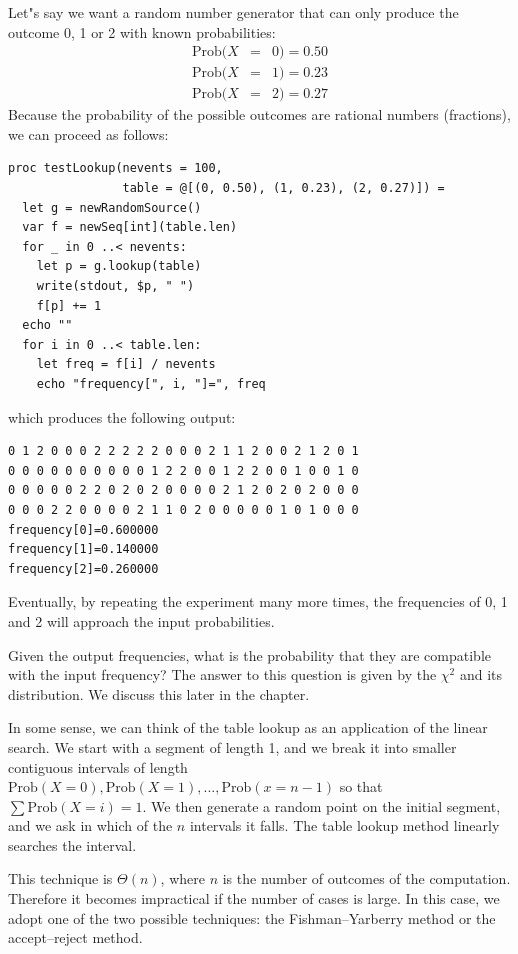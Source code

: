 \documentclass[justified, sixbynine]{tufte-book}
\theoremstyle{plain}%
\newtheorem * {corollary}{Corollary}
\theoremstyle{definition}
\theoremstyle{remark}
\newtheorem * {remark}{Remark}
\newtheorem * {note}{Note}
\begin{document}
\begin{fullwidth}
Let"s say we want a random number generator that can only produce the
outcome 0, 1 or 2 with known probabilities:
\begin{eqnarray}
\textrm{Prob}(X &=&0)=0.50 \\
\textrm{Prob}(X &=&1)=0.23 \\
\textrm{Prob}(X &=&2)=0.27
\end{eqnarray}
Because the probability of the possible outcomes are rational numbers
(fractions), we can proceed as follows:
\begin{lstlisting}
proc testLookup(nevents = 100,
                table = @[(0, 0.50), (1, 0.23), (2, 0.27)]) =
  let g = newRandomSource()
  var f = newSeq[int](table.len)
  for _ in 0 ..< nevents:
    let p = g.lookup(table)
    write(stdout, $p, " ")
    f[p] += 1
  echo ""
  for i in 0 ..< table.len:
    let freq = f[i] / nevents
    echo "frequency[", i, "]=", freq
\end{lstlisting}

which produces the following output:

\begin{lstlisting}
0 1 2 0 0 0 2 2 2 2 2 0 0 0 2 1 1 2 0 0 2 1 2 0 1
0 0 0 0 0 0 0 0 0 0 1 2 2 0 0 1 2 2 0 0 1 0 0 1 0
0 0 0 0 0 2 2 0 2 0 2 0 0 0 0 2 1 2 0 2 0 2 0 0 0
0 0 0 2 2 0 0 0 0 2 1 1 0 2 0 0 0 0 0 1 0 1 0 0 0
frequency[0]=0.600000
frequency[1]=0.140000
frequency[2]=0.260000
\end{lstlisting}

Eventually, by repeating the experiment many more times, the frequencies of
0, 1 and 2 will approach the input probabilities.

Given the output frequencies, what is the probability that they are compatible with the input frequency?
The answer to this question is given by the $\chi^2$ and its distribution. We discuss this later in the chapter.

In some sense, we can think of the table lookup as an application of the
linear search. We start with a segment of length 1, and we break it into smaller
contiguous intervals of length $\textrm{Prob}(X=0), \textrm{Prob}(X=1), ..., \textrm{Prob}(x=n-1)$ so that $\sum
\textrm{Prob}(X=i)=1.$ We then generate a random point on the initial segment, and we ask
in which of the $n$ intervals it falls. The table lookup method linearly
searches the interval.

This technique is $\Theta (n)$, where $n$ is the number of outcomes of the
computation. Therefore it becomes impractical if the number of cases is
large. In this case, we adopt one of the two possible techniques: the
Fishman--Yarberry method or the accept--reject method.


\end{fullwidth}
\end{document}
